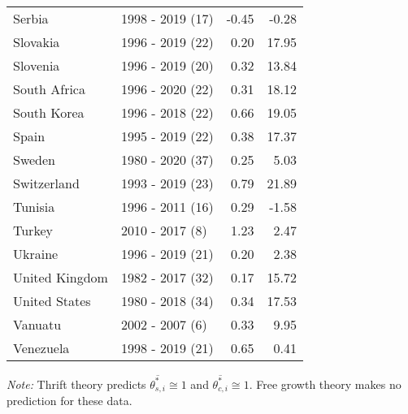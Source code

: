 \begin{table}[pos=h]
{{\begin{tabular}{llrr}
Serbia & 1998 - 2019 (17) & -0.45 & -0.28\\
Slovakia & 1996 - 2019 (22) & 0.20 & 17.95\\
\addlinespace
Slovenia & 1996 - 2019 (20) & 0.32 & 13.84\\
South Africa & 1996 - 2020 (22) & 0.31 & 18.12\\
South Korea & 1996 - 2018 (22) & 0.66 & 19.05\\
Spain & 1995 - 2019 (22) & 0.38 & 17.37\\
Sweden & 1980 - 2020 (37) & 0.25 & 5.03\\
\addlinespace
Switzerland & 1993 - 2019 (23) & 0.79 & 21.89\\
Tunisia & 1996 - 2011 (16) & 0.29 & -1.58\\
Turkey & 2010 - 2017 (8) & 1.23 & 2.47\\
Ukraine & 1996 - 2019 (21) & 0.20 & 2.38\\
United Kingdom & 1982 - 2017 (32) & 0.17 & 15.72\\
\addlinespace
United States & 1980 - 2018 (34) & 0.34 & 17.53\\
Vanuatu & 2002 - 2007 (6) & 0.33 & 9.95\\
Venezuela & 1998 - 2019 (21) & 0.65 & 0.41\\
\bottomrule \end{tabular}

}
}
\begin{flushleft}
\footnotesize \emph{Note:} Thrift theory predicts \(\overline{\theta^*_{s,i}} \cong 1\) and \(\overline{\theta^*_{c,i}} \cong 1\). Free growth theory  makes no prediction for these data.
\end{flushleft}
\end{table}